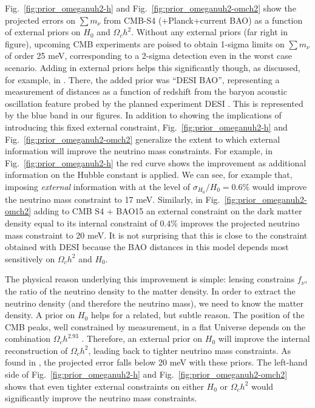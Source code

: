 \documentclass[aps,prd,reprint,superscriptaddress,nofootinbib]{revtex4-1}
\newcommand{\reffig}[1]{Fig.~\ref{fig:#1}}
\begin{document}
\reffig{prior_omeganuh2-h} and \reffig{prior_omeganuh2-omch2} show the projected errors on $\sum m_\nu$ from CMB-S4 (+Planck+current BAO) as a function of external priors on $H_{0}$ and $\Omega_{c}h^{2}$. 
Without any external priors (far right in figure), upcoming CMB experiments are poised to obtain 1-sigma limits on $\sum m_\nu$ of order 25 meV, corresponding to a 2-sigma detection even in the worst case scenario. Adding in external priors helps this significantly though, as discussed, for example, in \cite{di-valentino:2015,2013arXiv1309.5383A,pan:2015a,allison:2015}. 
There, the added prior was ``DESI BAO'', representing a measurement of distances as a function of redshift from the baryon acoustic oscillation feature probed by the planned experiment DESI \cite{levi:2013}. This is represented by the blue band in our figures. In addition to showing the implications of introducing this fixed external constraint, \reffig{prior_omeganuh2-h} and \reffig{prior_omeganuh2-omch2} generalize the extent to which external information will improve the neutrino mass constraints. For example, in \reffig{prior_omeganuh2-h} the red curve shows the improvement as additional information on the Hubble constant is applied. We can see, for example that, imposing {\it external} information with at the level of $\sigma_{H_0}/H_0=0.6\%$ would improve the neutrino mass constraint to 17 meV. Similarly, in \reffig{prior_omeganuh2-omch2} adding to CMB S4 + BAO15 an external constraint on the dark matter density equal to its internal constraint of $0.4\%$ improves the projected neutrino mass constraint to 20 meV. It is not surprising that this is close to the constraint obtained with DESI because the BAO distances in this model depends most sensitively on $\Omega_ch^2$ and $H_{0}$.

The physical reason underlying this improvement is simple: lensing constrains $f_\nu$, the ratio of the neutrino density to the matter density. In order to extract the neutrino density (and therefore the neutrino mass), we need to know the matter density. A prior on $H_{0}$ helps for a related, but subtle reason. 
The position of the CMB peaks, well constrained by measurement, in a flat Universe depends on the combination $\Omega_ch^{2.93}$ \cite{planck-collaboration:2014}.
Therefore, an external prior on $H_{0}$ will improve the internal reconstruction of $\Omega_ch^2$, leading back to tighter neutrino mass constraints.
As found in \cite{2013arXiv1309.5383A,pan:2015a,allison:2015}, the projected error falls below 20 meV with these priors. 
The left-hand side of \reffig{prior_omeganuh2-h} and \reffig{prior_omeganuh2-omch2} shows that even tighter external constraints on either $H_0$ or $\Omega_ch^2$ would significantly improve the neutrino mass constraints.
\end{document}
